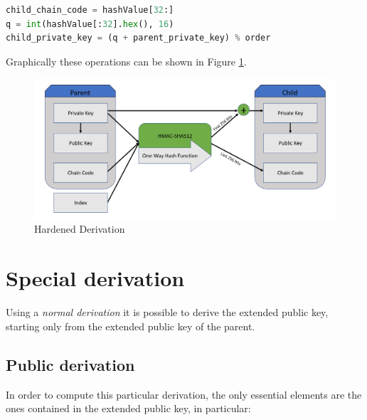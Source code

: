 \begin{lstlisting}[language=Python]
child_chain_code = hashValue[32:]
q = int(hashValue[:32].hex(), 16)
child_private_key = (q + parent_private_key) % order
\end{lstlisting}


\begin{flushleft}
	Graphically these operations can be shown in Figure \ref{fig:hardened_derivation}.
\end{flushleft}

\begin{figure}[ht!]
	\centering
	\includegraphics[width=14.5cm]{Figures/hardened_derivation_v2.png}
	\caption{Hardened Derivation }
	\label{fig:hardened_derivation}
\end{figure}


\section{Special derivation}
Using a \textit{normal derivation} it is possible to derive the extended public key, starting only from the extended public key of the parent.

\subsection{Public derivation}

In order to compute this particular derivation, the only essential elements are the ones contained in the extended public key, in particular:

